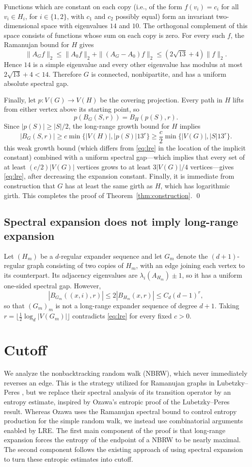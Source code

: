 \documentclass[11pt,reqno]{amsart}
\theoremstyle{definition}
\begin{document}
Functions which are constant on each copy (i.e., of the form $f(v_i) = c_i$ for all $v_i \in H_i$, for $i \in \{1,2\}$, with $c_1$ and $c_2$ possibly equal) form an invariant
two-dimensional space with eigenvalues $14$ and $10$.
The orthogonal complement of this space consists of
functions whose sum on each copy is zero. For every such $f$,
the Ramanujan bound for $H$ gives
\[
 \|A_Gf\|_2
 \le \|A_0f\|_2+\|(A_G-A_0)f\|_2
 \le (2\sqrt{13}+4)\|f\|_2.
\]
Hence $14$ is a simple eigenvalue and every other eigenvalue
has modulus at most $2\sqrt{13}+4<14$. Therefore $G$ is connected,
nonbipartite, and has a uniform absolute spectral gap.

Finally, let $p:V(G)\to V(H)$ be the covering projection.
Every path in $H$ lifts from either vertex above its
starting point, so
\[
 p(B_G(S,r))=B_H(p(S),r).
\]
Since $|p(S)|\ge|S|/2$, the long-range growth bound for
$H$ implies
\[
 |B_G(S,r)|
 \ge c\min\{|V(H)|,|p(S)|13^r\}
 \ge\frac c2\min\{|V(G)|,|S|13^r\}.
\]
this weak growth bound (which differs from \eqref{eq:lre} in the location of the implicit constant) combined with a uniform spectral gap---which implies that every set of at least
$(c/2)|V(G)|$ vertices grows to at least $3|V(G)|/4$ vertices---gives \eqref{eq:lre}, after decreasing the expansion constant. Finally, it is immediate from construction that $G$ has at least the same girth as $H$, which has logarithmic girth. This completes the proof of Theorem~\ref{thm:construction}. \qed


\subsection{Spectral expansion does not imply long-range expansion}
Let $(H_m)$ be a $d$-regular expander sequence and let
$G_m$ denote the $(d+1)$-regular graph consisting of two
copies of $H_m$, with an edge joining each vertex to its counterpart. Its adjacency eigenvalues are $\lambda_i(A_{H_m})\pm1$, so it has a
uniform one-sided spectral gap. However,
\[
 |B_{G_m}((x,i),r)|\le2|B_{H_m}(x,r)|\le C_d(d-1)^r,
\]
so that $(G_m)_m$ is not a long-range expander sequence of degree $d+1$. Taking $r=\lfloor\tfrac12\log_d|V(G_m)|\rfloor$
contradicts \eqref{eq:lre} for every fixed $c>0$.

\section{Cutoff}\label{sec:cutoff-proof}

We analyze the nonbacktracking random walk (NBRW), which never immediately reverses
an edge. This is the strategy utilized for Ramanujan graphs in Lubetzky--Peres
\cite{LP}, but we replace their spectral analysis of its transition
operator by an entropy estimate, inspired by Ozawa's entropic proof \cite{Ozawa} of the Lubetzky--Peres result. Whereas Ozawa
uses the Ramanujan spectral bound to control entropy production for the simple
random walk, we instead use combinatorial arguments enabled by LRE. The first main component of the proof is that long-range expansion
forces the entropy of the endpoint of a NBRW to be nearly maximal. The second component follows the existing approach of using spectral expansion to turn these entropic estimates into cutoff.
\end{document}

